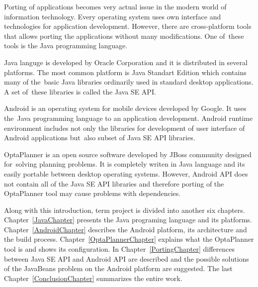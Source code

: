 Porting of applications becomes very actual issue in the modern world of information technology. Every operating system uses own interface and technologies for application development. However, there are cross-platform tools that allows porting the applications without many modifications. One of~these tools is the Java programming language.

Java languge is developed by Oracle Corporation and it is distributed in several platforms. The most common platform is Java Standart Edition which contains many of the~basic Java libraries ordinarily used in standard desktop applications. A set of~these libraries is called the Java SE API.

Android is an operating system for mobile devices developed by Google. It uses the~Java programming language to an application development. Android runtime environment includes not only the libraries for development of user interface of Android applications but~also subset of Java SE API libraries.

OptaPlanner is an open source software developed by JBoss community designed for~solving planning problems. It is completely writen in Java language and its easily portable between desktop operating systems. However, Android API does not contain all of the Java SE API libraries and therefore porting of the OptaPlanner tool may cause problems with dependencies.

Along with this introduction, term project is divided into another six chapters. Chapter~\ref{JavaChapter} presents the Java programing language and its platforms. Chapter~\ref{AndroidChapter} describes the Android platform, its architecture and the build process. Chapter~\ref{OptaPlannerChapter} explains what the OptaPlanner tool is and shows its configuration. In Chapter~\ref{PortingChapter} differences between Java SE API and Android API are described and the possible solutions of the JavaBeans problem on the Android platform are suggested. The last Chapter~\ref{ConclusionChapter} summarizes the entire work.

